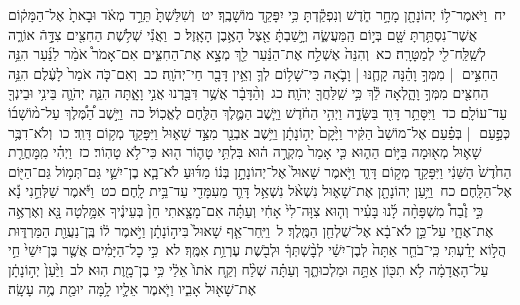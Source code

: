 \documentclass[18pt]{article}
\newcommand{\kri}[1]{\Afootnote{#1}}	%
\begin{document}
 {\loc יח~}וַיֹּאמֶר־ל֥וֹ יְהוֹנָתָ֖ן מָחָ֣ר חֹ֑דֶשׁ וְנִפְקַ֕דְתָּ כִּ֥י יִפָּקֵ֖ד מוֹשָׁבֶֽךָ׃ \startlock
 {\loc יט~}וְשִׁלַּשְׁתָּ֙ תֵּרֵ֣ד מְאֹ֔ד וּבָאתָ֙ אֶל־הַמָּק֔וֹם אֲשֶׁר־נִסְתַּ֥רְתָּ שָּׁ֖ם בְּי֣וֹם הַֽמַּעֲשֶׂ֑ה וְיָ֣שַׁבְתָּ֔ אֵ֖צֶל הָאֶ֥בֶן הָאָֽזֶל׃ \startlock
 {\loc כ~}וַאֲנִ֕י שְׁלֹ֥שֶׁת הַחִצִּ֖ים צִדָּ֣הֿ אוֹרֶ֑ה לְשַֽׁלַּֽח־לִ֖י לְמַטָּרָֽה׃ \startlock
 {\loc כא~}וְהִנֵּה֙ אֶשְׁלַ֣ח אֶת־הַנַּ֔עַר לֵ֖ךְ מְצָ֣א אֶת־הַחִצִּ֑ים אִם־אָמֹר֩ אֹמַ֨ר לַנַּ֜עַר הִנֵּ֥ה הַחִצִּ֣ים  |  מִמְּךָ֣ וָהֵ֗נָּה קָחֶ֧נּוּ  |  וָבֹ֛אָה כִּי־שָׁל֥וֹם לְךָ֛ וְאֵ֥ין דָּבָ֖ר חַי־יְהֹוָֽה׃ \startlock
 {\loc כב~}וְאִם־כֹּ֤ה אֹמַר֙ לָעֶ֔לֶם הִנֵּ֥ה הַחִצִּ֖ים מִמְּךָ֣ וָהָ֑לְאָה לֵ֕ךְ כִּ֥י שִֽׁלַּחֲךָ֖ יְהֹוָֽה׃ \startlock
 {\loc כג~}וְהַ֨דָּבָ֔ר אֲשֶׁ֥ר דִּבַּ֖רְנוּ אֲנִ֣י וָאָ֑תָּה הִנֵּ֧ה יְהֹוָ֛ה בֵּינִ֥י וּבֵינְךָ֖ עַד־עוֹלָֽם׃ \startlock
 {\loc כד~}וַיִּסָּתֵ֥ר דָּוִ֖ד בַּשָּׂדֶ֑ה וַיְהִ֣י הַחֹ֔דֶשׁ וַיֵּ֧שֶׁב הַמֶּ֛לֶךְ  \edtext{(על)}{\kri{קרי: אֶל־}} הַלֶּ֖חֶם לֶאֱכֽוֹל׃ \startlock
 {\loc כה~}וַיֵּ֣שֶׁב הַ֠מֶּ֠לֶךְ עַל־מ֨וֹשָׁב֜וֹ כְּפַ֣עַם  |  בְּפַ֗עַם אֶל־מוֹשַׁב֙ הַקִּ֔יר וַיָּ֙קׇם֙ יְה֣וֹנָתָ֔ן וַיֵּ֥שֶׁב אַבְנֵ֖ר מִצַּ֣ד שָׁא֑וּל וַיִּפָּקֵ֖ד מְק֥וֹם דָּוִֽד׃ \startlock
 {\loc כו~}וְלֹא־דִבֶּ֥ר שָׁא֛וּל מְא֖וּמָה בַּיּ֣וֹם הַה֑וּא כִּ֤י אָמַר֙ מִקְרֶ֣ה ה֔וּא בִּלְתִּ֥י טָה֛וֹר ה֖וּא כִּי־לֹ֥א טָהֽוֹר׃ \startlock
 {\loc כז~}וַיְהִ֗י  מִֽמׇּחֳרַ֤ת  הַחֹ֙דֶשׁ֙ הַשֵּׁנִ֔י וַיִּפָּקֵ֖ד מְק֣וֹם דָּוִ֑ד \edtext{{פ}
}{\kri{פסקא באמצע פסוק}שמואל א כ כז} וַיֹּ֤אמֶר שָׁאוּל֙ אֶל־יְהוֹנָתָ֣ן בְּנ֔וֹ מַדּ֜וּעַ לֹא־בָ֧א בֶן־יִשַׁ֛י גַּם־תְּמ֥וֹל גַּם־הַיּ֖וֹם אֶל־הַלָּֽחֶם׃ \startlock
 {\loc כח~}וַיַּ֥עַן יְהוֹנָתָ֖ן אֶת־שָׁא֑וּל נִשְׁאֹ֨ל נִשְׁאַ֥ל דָּוִ֛ד מֵעִמָּדִ֖י עַד־בֵּ֥ית לָֽחֶם׃ \startlock
 {\loc כט~}וַיֹּ֡אמֶר שַׁלְּחֵ֣נִי נָ֡א כִּ֣י זֶ֩בַח֩ מִשְׁפָּחָ֨ה לָ֜נוּ בָּעִ֗יר וְה֤וּא צִוָּה־לִי֙ אָחִ֔י וְעַתָּ֗ה אִם־מָצָ֤אתִי חֵן֙ בְּעֵינֶ֔יךָ אִמָּ֥לְטָה נָּ֖א וְאֶרְאֶ֣ה אֶת־אֶחָ֑י עַל־כֵּ֣ן לֹא־בָ֔א אֶל־שֻׁלְחַ֖ן הַמֶּֽלֶךְ׃ \startlock
 {\loc ל~}וַיִּֽחַר־אַ֤ף שָׁאוּל֙ בִּיה֣וֹנָתָ֔ן וַיֹּ֣אמֶר ל֔וֹ בֶּֽן־נַעֲוַ֖ת הַמַּרְדּ֑וּת הֲל֣וֹא יָדַ֗עְתִּי כִּֽי־בֹחֵ֤ר אַתָּה֙ לְבֶן־יִשַׁ֔י לְבׇ֨שְׁתְּךָ֔ וּלְבֹ֖שֶׁת עֶרְוַ֥ת אִמֶּֽךָ׃ \startlock
 {\loc לא~}כִּ֣י כׇל־הַיָּמִ֗ים אֲשֶׁ֤ר בֶּן־יִשַׁי֙ חַ֣י עַל־הָאֲדָמָ֔ה לֹ֥א תִכּ֖וֹן אַתָּ֣ה וּמַלְכוּתֶ֑ךָ וְעַתָּ֗ה שְׁלַ֨ח וְקַ֤ח אֹתוֹ֙ אֵלַ֔י כִּ֥י בֶן־מָ֖וֶת הֽוּא׃ \startlock
 {\loc לב~}וַיַּ֙עַן֙ יְה֣וֹנָתָ֔ן אֶת־שָׁא֖וּל אָבִ֑יו וַיֹּ֧אמֶר אֵלָ֛יו לָ֥מָּה יוּמַ֖ת מֶ֥ה עָשָֽׂה׃ \startlock
\end{document}
